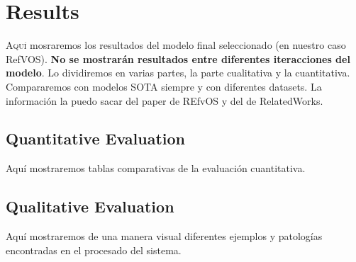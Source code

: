 

\chapter{Results} \label{cha:results}



\lettrine{A}{quí} mosraremos los resultados del modelo final seleccionado (en
nuestro caso RefVOS). \textbf{No se mostrarán resultados entre diferentes
  iteracciones del modelo}. Lo dividiremos en varias partes, la parte
cualitativa y la cuantitativa. Compararemos con modelos SOTA siempre y con
diferentes datasets. La información la puedo sacar del paper de REfvOS y del de
RelatedWorks.


\section{Quantitative Evaluation}

Aquí mostraremos tablas comparativas de la evaluación cuantitativa.


\section{Qualitative Evaluation}

Aquí mostraremos de una manera visual diferentes ejemplos y patologías
encontradas en el procesado del sistema.
